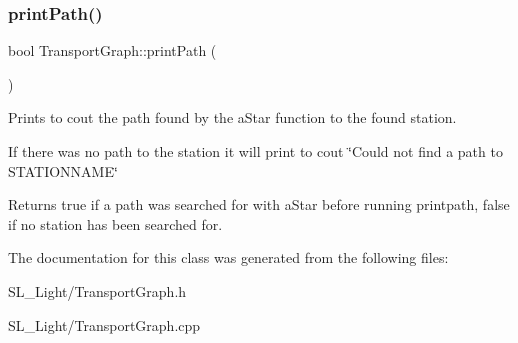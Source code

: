 \subsubsection{\texorpdfstring{printPath()}{printPath()}}
{\footnotesize\ttfamily bool Transport\+Graph\+::print\+Path (\begin{DoxyParamCaption}{ }\end{DoxyParamCaption})}

Prints to cout the path found by the a\+Star function to the found station. 

If there was no path to the station it will print to cout \char`\"{}\+Could not find a path to S\+T\+A\+T\+I\+O\+N\+N\+A\+M\+E\char`\"{}

\begin{DoxyReturn}{Returns}
true if a path was searched for with a\+Star before running printpath, false if no station has been searched for. 
\end{DoxyReturn}


The documentation for this class was generated from the following files\+:\begin{DoxyCompactItemize}
\item 
S\+L\+\_\+\+Light/Transport\+Graph.\+h\item 
S\+L\+\_\+\+Light/Transport\+Graph.\+cpp\end{DoxyCompactItemize}
